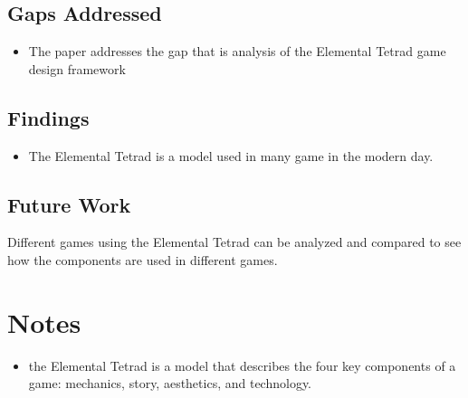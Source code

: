 \subsection{Gaps Addressed}
\begin{itemize}
    \item The paper addresses the gap that is analysis of the Elemental Tetrad game design framework
\end{itemize}

\subsection{Findings}
\begin{itemize}
    \item The Elemental Tetrad is a model used in many game in the modern day.
\end{itemize}


\subsection{Future Work}
Different games using the Elemental Tetrad can be analyzed and compared to see how the components are used in different games.  

\section{Notes}
\begin{itemize}
\item the Elemental Tetrad is a model that describes the four key components of a game: mechanics, story, aesthetics, and technology.

\end{itemize}
